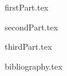 \justifying

{firstPart.tex}

\newpage

{secondPart.tex}


{thirdPart.tex}

\newpage

{bibliography.tex}